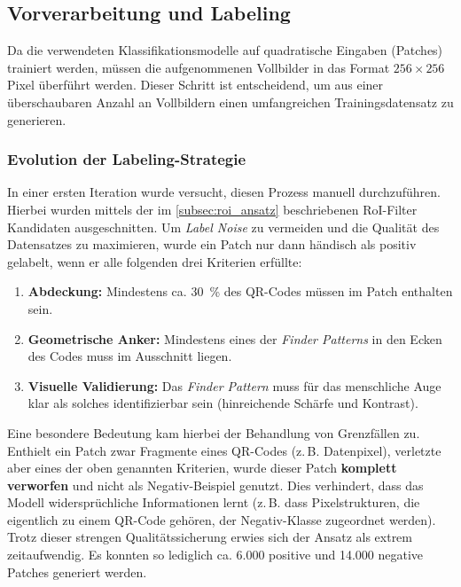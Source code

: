 \documentclass[
    a4paper,        %
    11pt,           %
    ngerman,        %
    parskip=half,   %
    listof=totoc,   %
    bibliography=totoc %
]{scrartcl}
\begin{document}
\subsection{Vorverarbeitung und Labeling} \label{subsec:vorverarbeitung_labeling}

Da die verwendeten Klassifikationsmodelle auf quadratische Eingaben (Patches) trainiert werden, müssen die aufgenommenen Vollbilder in das Format $256 \times 256$ Pixel überführt werden. Dieser Schritt ist entscheidend, um aus einer überschaubaren Anzahl an Vollbildern einen umfangreichen Trainingsdatensatz zu generieren.

\subsubsection{Evolution der Labeling-Strategie} \label{subsubsec:evolution_labeling}
In einer ersten Iteration wurde versucht, diesen Prozess manuell durchzuführen. Hierbei wurden mittels der im \autoref{subsec:roi_ansatz} beschriebenen RoI-Filter Kandidaten ausgeschnitten. Um \textit{Label Noise} zu vermeiden und die Qualität des Datensatzes zu maximieren, wurde ein Patch nur dann händisch als positiv gelabelt, wenn er alle folgenden drei Kriterien erfüllte:

\begin{enumerate}
    \item \textbf{Abdeckung:} Mindestens ca. \SI{30}{\percent} des QR-Codes müssen im Patch enthalten sein.
    \item \textbf{Geometrische Anker:} Mindestens eines der \textit{Finder Patterns} in den Ecken des Codes muss im Ausschnitt liegen.
    \item \textbf{Visuelle Validierung:} Das \textit{Finder Pattern} muss für das menschliche Auge klar als solches identifizierbar sein (hinreichende Schärfe und Kontrast).
\end{enumerate}

Eine besondere Bedeutung kam hierbei der Behandlung von Grenzfällen zu. Enthielt ein Patch zwar Fragmente eines QR-Codes (z.\,B. Datenpixel), verletzte aber eines der oben genannten Kriterien, wurde dieser Patch \textbf{komplett verworfen} und nicht als Negativ-Beispiel genutzt. Dies verhindert, dass das Modell widersprüchliche Informationen lernt (z.\,B. dass Pixelstrukturen, die eigentlich zu einem QR-Code gehören, der Negativ-Klasse zugeordnet werden).
Trotz dieser strengen Qualitätssicherung erwies sich der Ansatz als extrem zeitaufwendig. Es konnten so lediglich ca. 6.000 positive und 14.000 negative Patches generiert werden.
\end{document}
